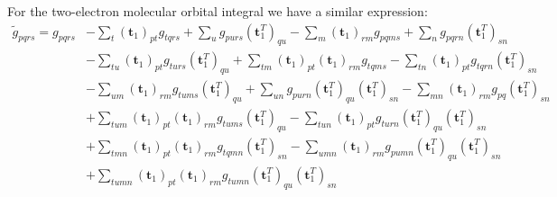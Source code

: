 For the two-electron molecular orbital integral we have a similar expression:
\begin{equation}
    \label{eq:g_transformation}
  \begin{split}
    {\tilde g}_{pqrs}=g_{pqrs}&-\sum_t(\mathbf{t}_1)_{pt}g_{tqrs}+\sum_ug_{purs}(\mathbf{t}_1^T)_{qu}-\sum_m(\mathbf{t}_1)_{rm}g_{pqms}+\sum_ng_{pqrn}(\mathbf{t}_1^T)_{sn}\\
    &-\sum_{tu}(\mathbf{t}_1)_{pt}g_{turs}(\mathbf{t}_1^T)_{qu}+\sum_{tm}(\mathbf{t}_1)_{pt}(\mathbf{t}_1)_{rm}g_{tqms}-\sum_{tn}(\mathbf{t}_1)_{pt}g_{tqrn}(\mathbf{t}_1^T)_{sn}\\
    &-\sum_{um}(\mathbf{t}_1)_{rm}g_{tums}(\mathbf{t}_1^T)_{qu}+\sum_{un}g_{purn}(\mathbf{t}_1^T)_{qu}(\mathbf{t}_1^T)_{sn}-\sum_{mn}(\mathbf{t}_1)_{rm}g_{pq}(\mathbf{t}_1^T)_{sn}\\
    &+\sum_{tum}(\mathbf{t}_1)_{pt}(\mathbf{t}_1)_{rm}g_{tums}(\mathbf{t}_1^T)_{qu}-\sum_{tun}(\mathbf{t}_1)_{pt}g_{turn}(\mathbf{t}_1^T)_{qu}(\mathbf{t}_1^T)_{sn}\\
    &+\sum_{tmn}(\mathbf{t}_1)_{pt}(\mathbf{t}_1)_{rm}g_{tqmn}(\mathbf{t}_1^T)_{sn}-\sum_{umn}(\mathbf{t}_1)_{rm}g_{pumn}(\mathbf{t}_1^T)_{qu}(\mathbf{t}_1^T)_{sn}\\
    &+\sum_{tumn}(\mathbf{t}_1)_{pt}(\mathbf{t}_1)_{rm}g_{tumn}(\mathbf{t}_1^T)_{qu}(\mathbf{t}_1^T)_{sn}
  \end{split}
\end{equation}

